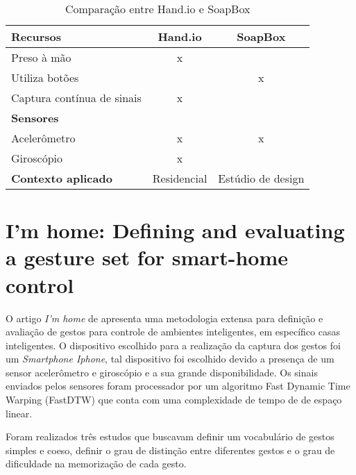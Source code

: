 \begin{table}[ht]
	\centering
    \caption{Comparação entre Hand.io e SoapBox}
    \label{tab:comp_soapbox}
	\begin{tabular}{|l|c|c|}
    	\hline
		\textbf{Recursos} & \textbf{Hand.io} & \textbf{SoapBox} \\
        \hline
        \hline
        Preso à mão & x &  \\
        \hline
        Utiliza botões &  & x \\
        \hline
        Captura contínua de sinais & x &  \\
        \hline
        \hline
        \textbf{Sensores} & & \\
        \hline
        \hline
        Acelerômetro & x & x \\
        \hline
        Giroscópio & x & \\
        \hline
        \hline
        \textbf{Contexto aplicado} & Residencial & Estúdio de design \\
        \hline
	\end{tabular}

\end{table}




\section{I'm home: Defining and evaluating a gesture set for smart-home control}

\label{cor:home}

O artigo \textit{I'm home} de  apresenta uma metodologia extensa para definição e avaliação de gestos para controle de ambientes inteligentes, em específico casas inteligentes. 
O dispositivo escolhido para a realização da captura dos gestos foi um \textit{Smartphone Iphone}, tal dispositivo foi escolhido devido a presença de um sensor acelerômetro e giroscópio e a sua grande disponibilidade. Os sinais enviados pelos sensores foram processador por um algoritmo Fast Dynamic Time Warping (FastDTW) \cite{Salvador:2007} que conta com uma complexidade de tempo de de espaço linear.

Foram realizados três estudos que buscavam definir um vocabulário de gestos simples e coeso, definir o grau de distinção entre diferentes gestos e o grau de dificuldade na memorização de cada gesto. 

